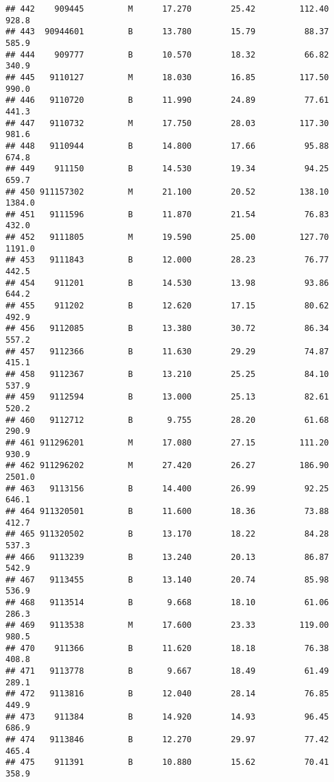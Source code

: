 \documentclass[
]{article}
\begin{document}
\begin{verbatim}
## 442    909445         M      17.270        25.42         112.40     928.8
## 443  90944601         B      13.780        15.79          88.37     585.9
## 444    909777         B      10.570        18.32          66.82     340.9
## 445   9110127         M      18.030        16.85         117.50     990.0
## 446   9110720         B      11.990        24.89          77.61     441.3
## 447   9110732         M      17.750        28.03         117.30     981.6
## 448   9110944         B      14.800        17.66          95.88     674.8
## 449    911150         B      14.530        19.34          94.25     659.7
## 450 911157302         M      21.100        20.52         138.10    1384.0
## 451   9111596         B      11.870        21.54          76.83     432.0
## 452   9111805         M      19.590        25.00         127.70    1191.0
## 453   9111843         B      12.000        28.23          76.77     442.5
## 454    911201         B      14.530        13.98          93.86     644.2
## 455    911202         B      12.620        17.15          80.62     492.9
## 456   9112085         B      13.380        30.72          86.34     557.2
## 457   9112366         B      11.630        29.29          74.87     415.1
## 458   9112367         B      13.210        25.25          84.10     537.9
## 459   9112594         B      13.000        25.13          82.61     520.2
## 460   9112712         B       9.755        28.20          61.68     290.9
## 461 911296201         M      17.080        27.15         111.20     930.9
## 462 911296202         M      27.420        26.27         186.90    2501.0
## 463   9113156         B      14.400        26.99          92.25     646.1
## 464 911320501         B      11.600        18.36          73.88     412.7
## 465 911320502         B      13.170        18.22          84.28     537.3
## 466   9113239         B      13.240        20.13          86.87     542.9
## 467   9113455         B      13.140        20.74          85.98     536.9
## 468   9113514         B       9.668        18.10          61.06     286.3
## 469   9113538         M      17.600        23.33         119.00     980.5
## 470    911366         B      11.620        18.18          76.38     408.8
## 471   9113778         B       9.667        18.49          61.49     289.1
## 472   9113816         B      12.040        28.14          76.85     449.9
## 473    911384         B      14.920        14.93          96.45     686.9
## 474   9113846         B      12.270        29.97          77.42     465.4
## 475    911391         B      10.880        15.62          70.41     358.9

\end{verbatim}
\end{document}
